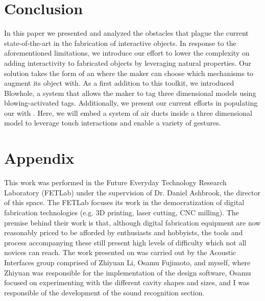   \section{Conclusion}
    In this paper we presented and analyzed the obstacles that plague the
    current state-of-the-art in the fabrication of interactive objects. In
    response to the aforementioned limitations, we introduce  our effort to lower the
    complexity on adding interactivity to fabricated objects by leveraging
    natural properties. Our solution takes the form of an \itoolkit
    where the maker can choose which mechanisms to augment its object with. As
    a first addition to this toolkit, we introduced Blowhole, a system that
    allows the maker to tag three dimensional models using
    blowing-activated tags. Additionally, we present our current efforts in
    populating our \itoolkit with \at. Here, we will embed a system
    of air ducts inside a three dimensional model to leverage touch
    interactions and enable a variety of gestures. 

  
  
  
  \newpage
  \section{Appendix}
    This work was performed in the Future Everyday Technology Research
    Laboratory (FETLab) under the supervision of Dr. Daniel Ashbrook, the
    director of this space. The FETLab focuses its work in the democratization
    of digital fabrication technologies (e.g. 3D printing, laser cutting, CNC
    milling). The premise behind their work is that, although digital
    fabrication equipment are now reasonably priced to be afforded by
    enthusiasts and hobbyists, the tools and process accompanying these still
    present high levels of difficulty which not all novices can reach. The work
    presented on \bh was carried out by the Acoustic Interfaces group comprised
    of Zhiyuan Li, Osamu Fujimoto, and myself, where Zhiyuan was responsible
    for the implementation of the design software, Osamu focused on
    experimenting with the different cavity shapes and sizes, and I was
    responsible of the development of the sound recognition section.


